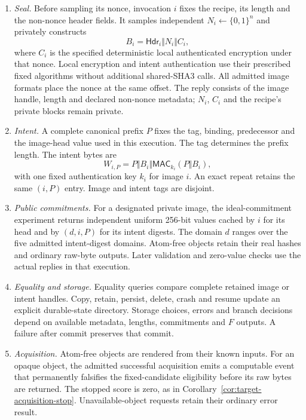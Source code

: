 \begin{enumerate}
  \item \emph{Seal.} Before sampling its nonce, invocation $i$ fixes the
  recipe, its length and the non-nonce header fields. It samples independent
  $N_i\gets\{0,1\}^{n}$ and privately constructs
  \[
    B_i=\mathsf{Hdr}_i\Vert N_i\Vert C_i,
  \]
  where $C_i$ is the specified deterministic local authenticated encryption
  under that nonce. Local encryption and intent authentication use their
  prescribed fixed algorithms without additional shared-SHA3 calls. All
  admitted image formats place the nonce at the same offset. The reply
  consists of the image handle, length and declared non-nonce metadata;
  $N_i$, $C_i$ and the recipe's private blocks remain private.
  \item \emph{Intent.} A complete canonical prefix $P$ fixes the tag,
  binding, predecessor and the image-head value used in this execution.
  The tag determines the prefix length. The intent bytes are
  \[
    W_{i,P}=P\Vert B_i\Vert
       \mathsf{MAC}_{k_i}(P\Vert B_i),
  \]
  with one fixed authentication key $k_i$ for image $i$. An exact repeat
  retains the same $(i,P)$ entry. Image and intent tags are disjoint.
  \item \emph{Public commitments.} For a designated private image, the
  ideal-commitment experiment returns independent uniform 256-bit values
  cached by $i$ for its head and by $(d,i,P)$ for its intent digests. The
  domain $d$ ranges over the five admitted intent-digest domains. Atom-free
  objects retain their real hashes and ordinary raw-byte outputs. Later
  validation and zero-value checks use the actual replies in that execution.
  \item \emph{Equality and storage.} Equality queries compare complete
  retained image or intent handles. Copy, retain, persist, delete, crash
  and resume update an explicit durable-state directory. Storage choices,
  errors and branch decisions depend on available metadata, lengths,
  commitments and $F$ outputs. A failure after commit preserves that commit.
  \item \emph{Acquisition.} Atom-free objects are rendered from their known
  inputs. For an opaque object, the admitted successful acquisition emits
  a computable event that permanently falsifies the fixed-candidate
  eligibility before its raw bytes are returned. The stopped score is zero,
  as in Corollary~\ref{cor:target-acquisition-stop}. Unavailable-object requests
  retain their ordinary error result.
\end{enumerate}

